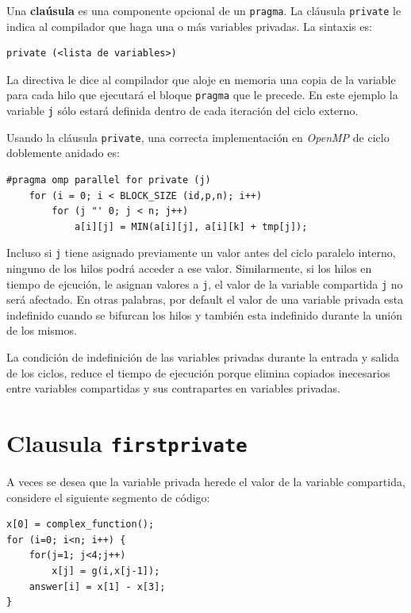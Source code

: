 \documentclass[12pt,letterpaper]{book}
\begin{document}
Una \textbf{claúsula}  es una componente opcional de un \texttt{pragma}. La cláusula \texttt{private} le indica al compilador que haga una o más variables privadas. La sintaxis es:

\begin{lstlisting}[style=C]
private (<lista de variables>)
\end{lstlisting}

La directiva le dice al compilador que aloje en memoria una copia de la variable para cada hilo que ejecutará el bloque \texttt{pragma} que le precede.  En este ejemplo la variable \texttt{j} sólo estará definida dentro de cada iteración del ciclo externo.

Usando la cláusula \texttt{private}, una correcta implementación en \textit{OpenMP} de ciclo doblemente anidado es:

\begin{lstlisting}[style=C]
#pragma omp parallel for private (j)
	for (i = 0; i < BLOCK_SIZE (id,p,n); i++) 
		for (j "' 0; j < n; j++)
			a[i][j] = MIN(a[i][j], a[i][k] + tmp[j]);
\end{lstlisting}

Incluso si \texttt{j} tiene asignado previamente un valor antes del ciclo paralelo interno, ninguno de los hilos podrá acceder a ese valor. Similarmente, si los hilos en tiempo de ejcución, le asignan valores a \texttt{j}, el valor de la variable compartida \texttt{j} no será afectado. En otras palabras, por default el valor de una variable privada esta indefinido cuando se bifurcan los hilos y también esta indefinido durante la unión de los mismos.

La condición de indefinición de las variables privadas durante la entrada y salida de los ciclos, reduce el tiempo de ejecución porque elimina copiados inecesarios  entre variables compartidas y sus contrapartes en variables privadas.


\section{Clausula \texttt{firstprivate}}

A veces se desea que la variable privada herede el valor de la variable compartida, considere el siguiente segmento de código:

\begin{lstlisting}[style=C]
x[0] = complex_function(); 
for (i=0; i<n; i++) {
	for(j=1; j<4;j++) 
		x[j] = g(i,x[j-1]);
	answer[i] = x[1] - x[3];
}
\end{lstlisting}
\end{document}
